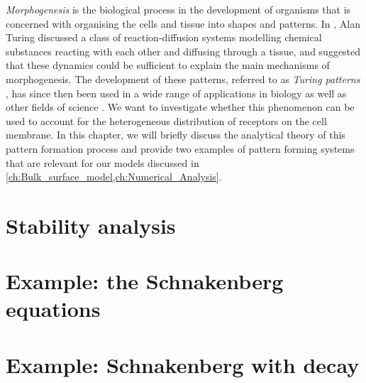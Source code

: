\emph{Morphogenesis} is the biological process in the development of organisms that is concerned with organising the cells and tissue into shapes and patterns. In \cite{turing52}, Alan Turing discussed a class of reaction-diffusion systems modelling chemical substances reacting with each other and diffusing through a tissue, and suggested that these dynamics could be sufficient to explain the main mechanisms of morphogenesis. The development of these patterns, referred to as \emph{Turing patterns} \cite{murray03}, has since then been used in a wide range of applications in biology \cite{murray03,economou12} as well as other fields of science \cite{zincenko21}. We want to investigate whether this phenomenon can be used to account for the heterogeneous distribution of receptors on the cell membrane. In this chapter, we will briefly discuss the analytical theory of this pattern formation process and provide two examples of pattern forming systems that are relevant for our models discussed in \cref{ch:Bulk_surface_model,ch:Numerical_Analysis}.

\section{Stability analysis}


\section{Example: the Schnakenberg equations}
\label{sec:schnakenberg_example}


\section{Example: Schnakenberg with decay}
\label{sec:schnakenberg_decay_example}
